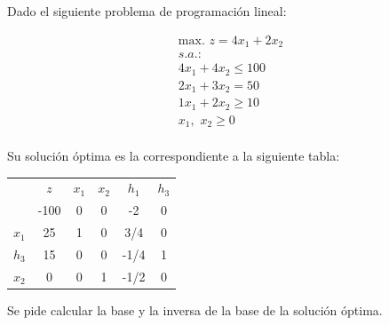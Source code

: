 Dado el siguiente problema de programación lineal:

\begin{equation}
\begin{split}
\mbox{max. } z = 4x_1 + 2x_2\\
s.a.:\\
4x_1 + 4x_2  \leq 100\\
2x_1 + 3x_2  = 50\\
1x_1 + 2x_2  \geq 10\\
x_1,\,\,x_2\geq 0\\
\end{split}
\end{equation}

Su solución óptima es la correspondiente a la siguiente tabla:

\begin{center}
\begin{tabular}{c|c|cccc|}
 & $z$ & $x_1$ & $x_2$ & $h_1$ & $h_3$\\ 
 & -100 & 0 & 0 & -2 & 0  \\ 
\hline
$x_1$ & 25  & 1 & 0 & 3/4 & 0 \\ 
$h_3$ & 15  & 0 & 0 & -1/4 & 1 \\ 
$x_2$ & 0  & 0 & 1 & -1/2 & 0 \\ 
\hline
\end{tabular}
\end{center}




Se pide calcular la base y la inversa de la base de la solución óptima.